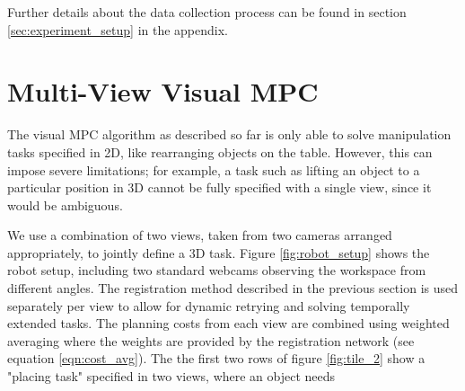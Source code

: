 Further details about the data collection process can be found in section \ref{sec:experiment_setup} in the appendix.

\section{Multi-View Visual MPC}
\label{sec:multiview}
The visual MPC algorithm as described so far is only able to solve manipulation tasks specified in 2D, like rearranging objects on the table. However, this can impose severe limitations; for example, a task such as lifting an object to a particular position in 3D cannot be fully specified with a single view, since it would be ambiguous. 

We use a combination of two views, taken from two cameras arranged appropriately, to jointly define a 3D task. Figure \ref{fig:robot_setup} shows the robot setup, including two standard webcams observing the workspace from different angles. The registration method described in the previous section is used separately per view to allow for dynamic retrying and solving temporally extended tasks. The planning costs from each view are combined using weighted averaging where the weights are provided by the registration network (see equation \ref{eqn:cost_avg}).  The the first two rows of figure \ref{fig:tile_2} show a "placing task" specified in two views, where an object needs 





